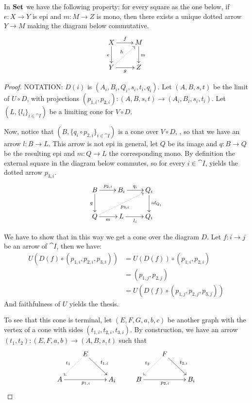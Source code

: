 {\begin{remark}\label{rem:ima}In $\mathbf{Set}$ we have the following property: for every square as the one below, if $e\colon X\to Y$ is epi and $m\colon M\to Z$ is mono, then there exists a unique dotted arrow $Y\to M$ making the diagram below commutative.
	\[\xymatrix{X \ar[r]^{f} \ar[d]_{e}& M \ar[d]^{m}\\ Y \ar[r]_{g} \ar@{.>}[ur]^{h}& Z}\] 
\end{remark}


\begin{proof} 
	NOTATION: $D(i)$ is $(A_i, B_i, Q_i, s_i, t_i, q_i)$.	Let $(A, B, s, t)$ be the limit of $U\circ D$, with projections $(p_{1,i}, p_{2,i})\colon (A,B, s,t)\to (A_i, B_i, s_i, t_i)$. Let $(L, \{l_i\}_{i\in \cat{I}})$ be a limiting cone for $V\circ D$. 
	
	Now, notice that $(B, \{q_i\circ p_{2,i}\}_{i\in \cat{I}})$ is a cone over $V\circ D$, , so that we have an arrow $l\colon B\to L$. This arrow is not epi in general, let $Q$ be its image and $q\colon B\to Q$ be the resulting epi and $m\colon Q\to L$ the corresponding mono.
	By definition the external square in the diagram below commutes, so for every $i\in \cat{I}$,  yields the dotted arrow $p_{3,i}$.
	\[\xymatrix{B \ar[r]^{p_{2,i}} \ar[d]_{q}& B_i \ar[r]^{q_i} & Q_i \ar[d]^{id_{Q_i}}\\ Q \ar[r]_{m} \ar@{.>}[urr]_{p_{3,i}}& L \ar[r]_{l_i} & Q_i}\]
	
	We have to show that in this way we get a cone over the diagram $D$. Let $f\colon i\to j$ be an arrow of $\cat{I}$, then we have:
	\begin{align*}
	U(D(f)\circ (p_{1,i}, p_{2, i}, p_{3,i}))  &=  U(D(f))\circ(p_{1,i}, p_{2, i})\\
                                                   &=  (p_{1,j}, p_{2, j})\\
                                                   &=  U(D(f)\circ (p_{1,j}, p_{2, j}, p_{3,j}))
	\end{align*}
	 And faithfulness of $U$ yields the thesis.
	 
	 To see that this cone is terminal, let $(E, F, G, a, b, c)$ be another graph with the vertex of a cone with sides $(t_{1,i},t_{2, i}, t_{3,i})$. By construction, we have an arrow $(t_1, t_2)\colon (E, F, a, b)\to (A, B, s, t)$ such that
	 \[\xymatrix{&E \ar@{.>}[dl]_{t_1} \ar[dr]^{t_{1,i}}&&&F \ar@{.>}[dl]_{t_2} \ar[dr]^{t_{2,i}}\\ A \ar[rr]_{p_{1,i}} & & A_i & B \ar[rr]_{p_{2,i}}&& B_i }\]
	

\end{proof}}
